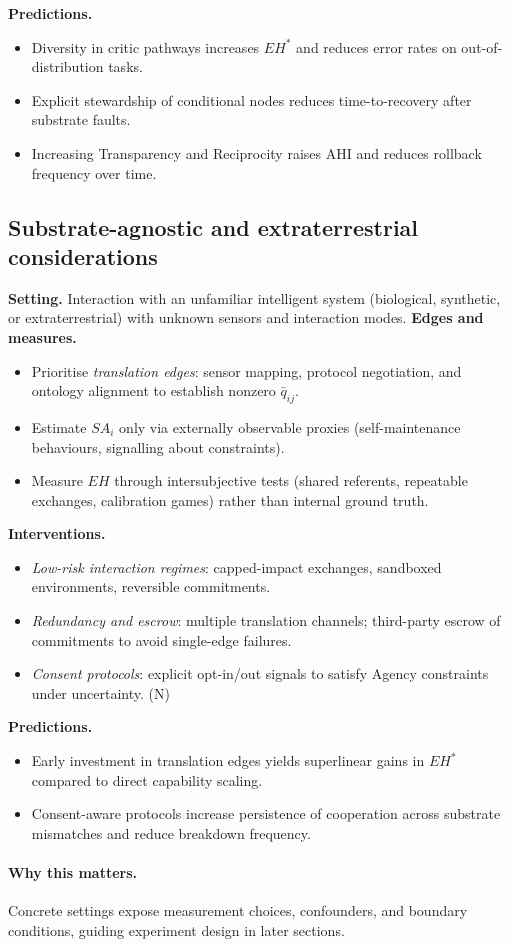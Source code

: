 \documentclass[12pt]{article}
\begin{document}
\noindent\textbf{Predictions.} \begin{itemize}[leftmargin=1.2em] \item Diversity in critic pathways increases $EH^\ast$ and reduces error rates on out-of-distribution tasks. \item Explicit stewardship of conditional nodes reduces time-to-recovery after substrate faults. \item Increasing Transparency and Reciprocity raises AHI and reduces rollback frequency over time. \end{itemize} \subsection{Substrate-agnostic and extraterrestrial considerations} \textbf{Setting.} Interaction with an unfamiliar intelligent system (biological, synthetic, or extraterrestrial) with unknown sensors and interaction modes. \medskip \noindent\textbf{Edges and measures.} \begin{itemize}[leftmargin=1.2em] \item Prioritise \emph{translation edges}: sensor mapping, protocol negotiation, and ontology alignment to establish nonzero $\bar{q}_{ij}$. \item Estimate $SA_i$ only via externally observable proxies (self-maintenance behaviours, signalling about constraints). \item Measure $EH$ through intersubjective tests (shared referents, repeatable exchanges, calibration games) rather than internal ground truth. \end{itemize} \noindent\textbf{Interventions.} \begin{itemize}[leftmargin=1.2em] \item \emph{Low-risk interaction regimes}: capped-impact exchanges, sandboxed environments, reversible commitments. \item \emph{Redundancy and escrow}: multiple translation channels; third-party escrow of commitments to avoid single-edge failures. \item \emph{Consent protocols}: explicit opt-in/out signals to satisfy Agency constraints under uncertainty. (N) \end{itemize} \noindent\textbf{Predictions.} \begin{itemize}[leftmargin=1.2em] \item Early investment in translation edges yields superlinear gains in $EH^\ast$ compared to direct capability scaling. \item Consent-aware protocols increase persistence of cooperation across substrate mismatches and reduce breakdown frequency. \end{itemize} \paragraph{Why this matters.} Concrete settings expose measurement choices, confounders, and boundary conditions, guiding experiment design in later sections. 
\end{document}

